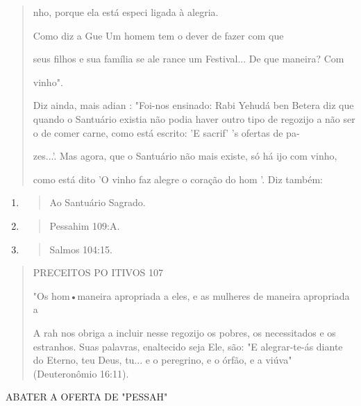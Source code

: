 \begin{quote}
nho, porque ela está especi ligada à alegria.

Como diz a Gue Um homem tem o dever de fazer com que

seus filhos e sua família se ale rance um Festival... De que maneira?
Com

vinho".

Diz ainda, mais adian : "Foi-nos ensinado: Rabi Yehudá ben Bete­ra diz
que quando o Santuário existia não podia haver outro tipo de regozijo a
não ser o de comer carne, como está escrito: 'E sacrif' 's ofertas de
pa-

zes...'. Mas agora, que o Santuário não mais existe, só há ijo com
vinho,

como está dito 'O vinho faz alegre o coração do hom '. Diz também:
\end{quote}

\begin{enumerate}
\def\labelenumi{\arabic{enumi}.}
\setcounter{enumi}{70}
\item
  \begin{quote}
  Ao Santuário Sagrado.
  \end{quote}
\item
  \begin{quote}
  Pessahim 109:A.
  \end{quote}
\item
  \begin{quote}
  Salmos 104:15.
  \end{quote}
\end{enumerate}

\begin{quote}
PRECEITOS PO ITIVOS 107

"Os hom•maneira apropriada a eles, e as mulheres de maneira apro­priada
a

A rah nos obriga a incluir nesse regozijo os pobres, os necessita­dos e
os estranhos. Suas palavras, enaltecido seja Ele, são: "E alegrar-te-ás
dian­te do Eterno, teu Deus, tu... e o peregrino, e o órfão, e a viúva"
(Deuteronômio 16:11).
\end{quote}

ABATER A OFERTA DE "PESSAH"

